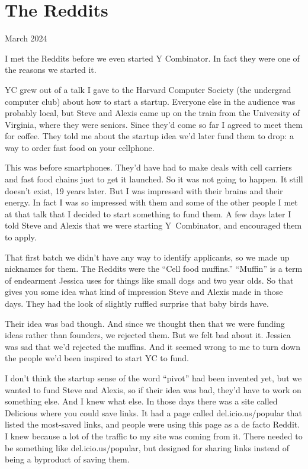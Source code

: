 \chapter{The Reddits}

March 2024

I met the Reddits before we even started Y Combinator. In fact they were
one of the reasons we started it.

YC grew out of a talk I gave to the Harvard Computer Society (the
undergrad computer club) about how to start a startup. Everyone else in
the audience was probably local, but Steve and Alexis came up on the
train from the University of Virginia, where they were seniors. Since
they'd come so far I agreed to meet them for coffee. They told me about
the startup idea we'd later fund them to drop: a way to order fast food
on your cellphone.

This was before smartphones. They'd have had to make deals with cell
carriers and fast food chains just to get it launched. So it was not
going to happen. It still doesn't exist, 19 years later. But I was
impressed with their brains and their energy. In fact I was so impressed
with them and some of the other people I met at that talk that I decided
to start something to fund them. A few days later I told Steve and
Alexis that we were starting Y~Combinator, and encouraged them to apply.

That first batch we didn't have any way to identify applicants, so we
made up nicknames for them. The Reddits were the ``Cell food muffins.''
``Muffin'' is a term of endearment Jessica uses for things like small
dogs and two year olds. So that gives you some idea what kind of
impression Steve and Alexis made in those days. They had the look of
slightly ruffled surprise that baby birds have.

Their idea was bad though. And since we thought then that we were
funding ideas rather than founders, we rejected them. But we felt bad
about it. Jessica was sad that we'd rejected the muffins. And it seemed
wrong to me to turn down the people we'd been inspired to start YC to
fund.

I don't think the startup sense of the word ``pivot'' had been invented
yet, but we wanted to fund Steve and Alexis, so if their idea was bad,
they'd have to work on something else. And I knew what else. In those
days there was a site called Delicious where you could save links. It
had a page called del.icio.us/popular that listed the most-saved links,
and people were using this page as a de facto Reddit. I knew because a
lot of the traffic to my site was coming from it. There needed to be
something like del.icio.us/popular, but designed for sharing links
instead of being a byproduct of saving them.

